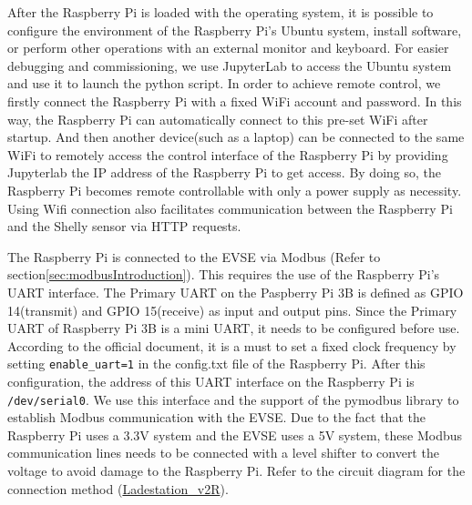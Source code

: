 \documentclass[
english,
ruledheaders=section,%
class=report,%
thesis={type=Report},%
accentcolor=9c,%
custommargins=true,%
marginpar=false,%
parskip=half-,%
fontsize=11pt,%
logofile={img/tuda_logo.pdf}, %
]{tudapub}
\begin{document}
    After the Raspberry Pi is loaded with the operating system, it is possible to configure the environment of the Raspberry Pi's Ubuntu system, install software, or perform other operations with an external monitor and keyboard. For easier debugging and commissioning, we use JupyterLab to access the Ubuntu system and use it to launch the python script. In order to achieve remote control, we firstly connect the Raspberry Pi with a fixed WiFi account and password. In this way, the Raspberry Pi can automatically connect to this pre-set WiFi after startup. And then another device(such as a laptop) can be connected to the same WiFi to remotely access the control interface of the Raspberry Pi by providing Jupyterlab the IP address of the Raspberry Pi to get access. By doing so, the Raspberry Pi becomes remote controllable with only a power supply as necessity. Using Wifi connection also facilitates communication between the Raspberry Pi and the Shelly sensor via HTTP requests.

    The Raspberry Pi is connected to the EVSE via Modbus (Refer to section\ref{sec:modbusIntroduction}). This requires the use of the Raspberry Pi's UART interface. The Primary UART on the Paspberry Pi 3B is defined as GPIO 14(transmit) and GPIO 15(receive) as input and output pins. Since the Primary UART of Raspberry Pi 3B is a mini UART, it needs to be configured before use. According to the official document, it is a must to set a fixed clock frequency by setting \texttt{enable\_uart=1} in the config.txt file of the Raspberry Pi. After this configuration, the address of this UART interface on the Raspberry Pi is \texttt{/dev/serial0}. We use this interface and the support of the pymodbus library to establish Modbus communication with the EVSE. \cite{miniUART}
    Due to the fact that the Raspberry Pi uses a 3.3V system and the EVSE uses a 5V system, these Modbus communication lines needs to be connected with a level shifter to convert the voltage to avoid damage to the Raspberry Pi. Refer to the circuit diagram for the connection method (\hyperref[add:Ladestation_v2R]{Ladestation\_v2R}).
\end{document}
